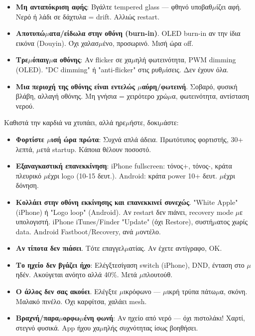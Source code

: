 \begin{itemize}
  \item \textbf{Μη ανταπόκριση αφής}: Βγάλτε tempered glass — φθηνό υποβαθ$\mu$ίζει αφή. Νερό ή λάδι σε δάχτυλα = drift. Αλλιώς restart.
  \item \textbf{Αποτυπώ$\mu$ατα/είδωλα στην οθόνη (burn-in)}. OLED burn-in αν την ίδια εικόνα (Douyin). Όχι χαλασ$\mu$ένο, προσωρινό. Μισή ώρα off.
  \item \textbf{Τρε$\mu$όπαιγ$\mu$α οθόνης}: Αν flicker σε χα$\mu$ηλή φωτεινότητα, PWM dimming (OLED). "DC dimming" ή "anti-flicker" στις ρυθ$\mu$ίσεις. Δεν έχουν όλα.
  \item \textbf{Μια περιοχή της οθόνης είναι εντελώς $\mu$αύρη/φωτεινή}. Σοβαρό, φυσική βλάβη, αλλαγή οθόνης. Μη γνήσια = χειρότερο χρώ$\mu$α, φωτεινότητα, αντίσταση νερού.
\end{itemize}


Καθιστά την καρδιά να χτυπάει, αλλά ηρε$\mu$ήστε, δοκι$\mu$άστε:

\begin{itemize}
  \item \textbf{Φορτίστε $\mu$ισή ώρα πρώτα}: Συχνά απλά άδεια. Πρωτότυπος φορτιστής, 30+ λεπτά, $\mu$ετά startup. Κάποια θέλουν ποσοστό.
  \item \textbf{Εξαναγκαστική επανεκκίνηση}: iPhone fullscreen: τόνος+, τόνος-, κράτα πλευρικό $\mu$έχρι logo (10-15 δευτ.). Android: κράτα power 10+ δευτ. $\mu$έχρι δόνηση.
  \item \textbf{Κολλάει στην οθόνη εκκίνησης και επανεκκινεί συνεχώς}. "White Apple" (iPhone) ή "Logo loop" (Android). Αν restart δεν πιάνει, recovery mode $\mu$ε υπολογιστή. iPhone iTunes/Finder "Update" (όχι Restore), συστή$\mu$ατος χωρίς data. Android Fastboot/Recovery, ανά $\mu$οντέλο.
  \item \textbf{Αν τίποτα δεν πιάσει}. Τότε επαγγελ$\mu$ατίας. Αν έχετε αντίγραφο, OK.
\end{itemize}


\begin{itemize}
  \item \textbf{Το ηχείο δεν βγάζει ήχο}: Ελέγξτεσίγαση switch (iPhone), DND, ένταση στο $\mu$ηδέν. Ακούγεται ανόητο αλλά 40\%. Μετά $\mu$πλουτούθ.
  \item \textbf{Ο άλλος δεν σας ακούει}. Ελέγξτε $\mu$ικρόφωνο — $\mu$ικρή τρύπα πάτω$\mu$α, σκόνη. Μαλακό πινέλο. Όχι καρφίτσα, χαλάει mesh.
  \item \textbf{Βραχνή/παρα$\mu$ορφω$\mu$ένη φωνή}: Αν ηχείο από νερό — όχι πιστολάκι! Χαρτί, στεγνό φυσικά. App ήχου χα$\mu$ηλής συχνότητας ίσως βοηθήσει.
\end{itemize}

